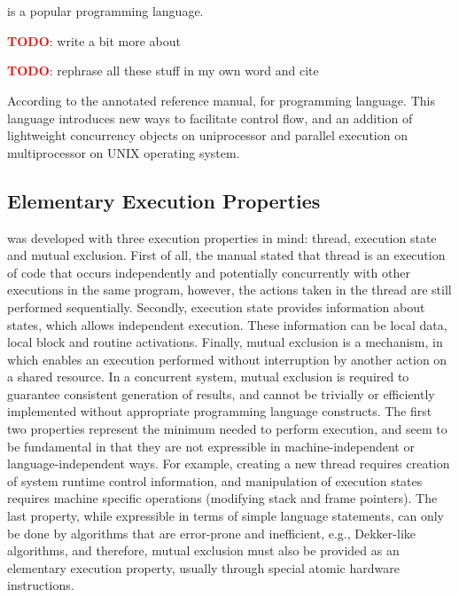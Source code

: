 \chapter{\uCPP}
\CC is a popular programming language.

\textbf{\textcolor{red}{TODO}}: write a bit more about \CC

\textbf{\textcolor{red}{TODO}}: rephrase all these stuff in my own word and cite

According to the \uCPP annotated reference manual, \uCPP
for \CC programming language. This language introduces new ways to facilitate
control flow, and an addition of lightweight concurrency objects on
uniprocessor and parallel execution on multiprocessor on UNIX operating
system.

\section{Elementary Execution Properties}
\uCPP was developed with three execution properties in mind: thread,
execution state and mutual exclusion. First of all, the manual stated that
thread is an execution of code that occurs independently and potentially
concurrently with other executions in the same program, however, the actions
taken in the thread are still performed sequentially. Secondly, execution state
provides information about states, which allows independent execution. These
information can be local data, local block and routine activations. Finally,
mutual exclusion is a mechanism, in which enables an execution performed without
interruption by another action on a shared resource. In a concurrent system, mutual exclusion is required to guarantee consistent
generation
of results, and cannot be trivially or efficiently implemented without
appropriate programming language
constructs.
The first two properties represent the minimum needed to perform execution, and
seem to be fundamental in that
they are not expressible in machine-independent or language-independent ways.
For example, creating a new thread
requires creation of system runtime control information, and manipulation of
execution states requires machine specific
operations (modifying stack and frame pointers). The last property, while
expressible in terms of simple language
statements, can only be done by algorithms that are error-prone and inefficient,
e.g., Dekker-like algorithms, and
therefore, mutual exclusion must also be provided as an elementary execution
property, usually through special atomic
hardware instructions.

